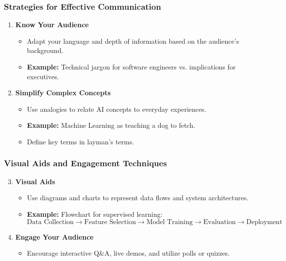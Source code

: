 \documentclass[aspectratio=169]{beamer}
\begin{document}
\begin{frame}[fragile]
    \frametitle{Strategies for Effective Communication}
    \begin{enumerate}
        \item \textbf{Know Your Audience}
            \begin{itemize}
                \item Adapt your language and depth of information based on the audience's background.
                \item \textbf{Example:} Technical jargon for software engineers vs. implications for executives.
            \end{itemize}
        \item \textbf{Simplify Complex Concepts}
            \begin{itemize}
                \item Use analogies to relate AI concepts to everyday experiences.
                \item \textbf{Example:} Machine Learning as teaching a dog to fetch.
                \item Define key terms in layman's terms.
            \end{itemize}
    \end{enumerate}
\end{frame}

\begin{frame}[fragile]
    \frametitle{Visual Aids and Engagement Techniques}
    \begin{enumerate}
        \setcounter{enumi}{2}
        \item \textbf{Visual Aids}
            \begin{itemize}
                \item Use diagrams and charts to represent data flows and system architectures.
                \item \textbf{Example:} Flowchart for supervised learning:
                \begin{equation}
                    \text{Data Collection} \rightarrow \text{Feature Selection} \rightarrow \text{Model Training} \rightarrow \text{Evaluation} \rightarrow \text{Deployment}
                \end{equation}
            \end{itemize}
        \item \textbf{Engage Your Audience}
            \begin{itemize}
                \item Encourage interactive Q&A, live demos, and utilize polls or quizzes.
            \end{itemize}
    \end{enumerate}
\end{frame}
\end{document}
